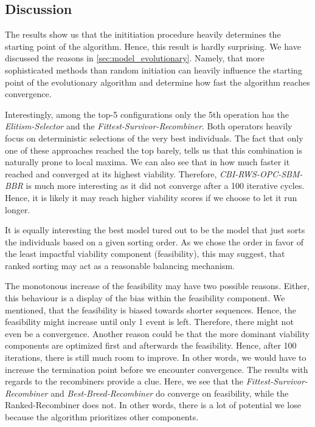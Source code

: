 \documentclass[./../../paper.tex]{subfiles}
\begin{document}
\subsection{Discussion}

The results show us that the inititiation procedure heavily determines the starting point of the algorithm. Hence, this result is hardly surprising. We have discussed the reasons in \autoref{sec:model_evolutionary}. Namely, that more sophisticated methods than random initiation can heavily influence the starting point of the evolutionary algorithm and determine how fast the algorithm reaches convergence. 

Interestingly, among the top-5 configurations only the 5th operation has the \emph{Elitism-Selector} and the \emph{Fittest-Survivor-Recombiner}. Both operators heavily focus on deterministic selections of the very best individuals. The fact that only one of these approaches reached the top barely, tells us that this combination is naturally prone to local maxima. We can also see that in how much faster it reached and converged at its highest viability. Therefore, \emph{CBI-RWS-OPC-SBM-BBR} is much more interesting as it did not converge after a 100 iterative cycles. Hence, it is likely it may reach higher viability scores if we choose to let it run longer.

It is equally interesting the best model tured out to be the model that just sorts the individuals based on a given sorting order. As we chose the order in favor of the least impactful viability component (feasibility), this may suggest, that ranked sorting may act as a reasonable balancing mechanism. 

The monotonous increase of the feasibility may have two possible reasons. Either, this behaviour is a display of the bias within the feasibility component. We mentioned, that the feasibility is biased towards shorter sequences. Hence, the feasibility might increase until only 1 event is left. Therefore, there might not even be a convergence. Another reason could be that the more dominant viability components are optimized first and afterwards the feasibility. Hence, after 100 iterations, there is still much room to improve. In other words, we would have to increase the termination point before we encounter convergence. The results with regards to the recombiners provide a clue. Here, we see that the \emph{Fittest-Survivor-Recombiner} and \emph{Best-Breed-Recombiner} do converge on feasibility, while the {Ranked-Recombiner} does not. In other words, there is a lot of potential we lose because the algorithm prioritizes other components. 
\end{document}
